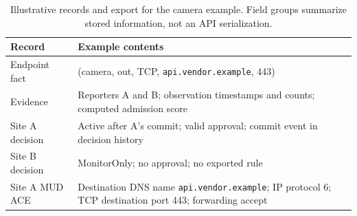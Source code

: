 \documentclass[journal]{IEEEtran}
\theoremstyle{definition}
\begin{document}
\begin{table}[t]
\centering
\caption{Illustrative records and export for the camera example. Field groups summarize stored information, not an API serialization.}
\label{tab:record-example}
\scriptsize
\begin{tabular}{@{}p{1.5cm}p{5.6cm}@{}}
\toprule
Record & Example contents \\
\midrule
Endpoint fact & (camera, out, TCP, \texttt{api.vendor.example}, 443) \\
Evidence & Reporters A and B; observation timestamps and counts; computed admission score \\
Site A decision & Active after A's commit; valid approval; commit event in decision history \\
Site B decision & MonitorOnly; no approval; no exported rule \\
Site A MUD ACE & Destination DNS name \texttt{api.vendor.example}; IP protocol 6; TCP destination port 443; forwarding accept \\
\bottomrule
\end{tabular}
\end{table}
\end{document}
